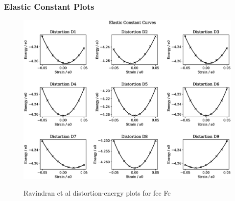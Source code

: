 \clearpage
\subsubsection{Elastic Constant Plots}

\begin{figure}[htb]
\centering
\includegraphics[width=.90\linewidth]{chapters/potentials_fe_pd_ru/fepd_potential/ec_rfkj/elastic_strains_bp_1.eps}  
\label{fig:fepd-fefcc-distortions}
\caption{Ravindran et al\cite{dftrfkj} distortion-energy plots for \acrshort{fcc} Fe}
\end{figure}

